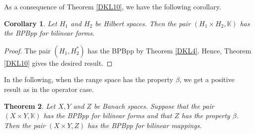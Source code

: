 \documentclass[12pt,a4paper]{amsart}
\newtheorem{theorem}{Theorem}[section]
\newtheorem{corollary}[theorem]{Corollary}
\theoremstyle{definition}
\numberwithin{equation}{section}
\newcommand{\K}{\mathbb{K}} %
\def\K{{\mathbb K}}
\begin{document}
As a consequence of Theorem \ref{DKL10}, we have the following corollary.

\begin{corollary} Let $H_1$ and $H_2$ be Hilbert spaces. Then the pair $(H_1 \times H_2, \K)$ has the BPBpp for bilinear forms.
\label{DKL12}
\end{corollary}
\begin{proof} The pair $(H_1, H_2^*)$ has the BPBpp by Theorem \ref{DKL4}. Hence, Theorem \ref{DKL10} gives the desired result.
\end{proof}

In the following, when the range space has the property $\beta$, we get a positive result as in the operator case.
\begin{theorem}
Let $X, Y$ and $Z$ be Banach spaces. Suppose that the pair $(X \times Y, \K)$ has the BPBpp for bilinear forms and that $Z$ has the property $\beta$. Then the pair $(X \times Y, Z)$ has the BPBpp for bilinear mappings.
\label{DKL13}
\end{theorem}
\end{document}
